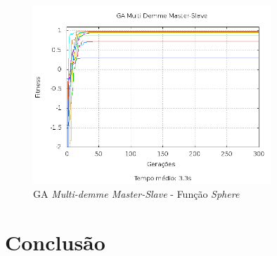 \documentclass[12pt]{article}
\begin{document}
\begin{figure}[hp]
  \centering
  \includegraphics[width=0.8\textwidth]{msmd_f1.png}
  \caption{GA \emph{Multi-demme Master-Slave} - Função \emph{Sphere}}
\end{figure}






\section{Conclusão} %
\label{sec:conclusao}










\end{document}
